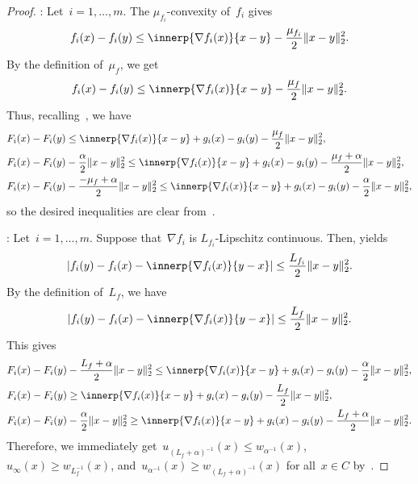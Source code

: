 \documentclass[../main]{subfiles}
\begin{document}
\begin{proof}
    :
Let~$i = 1, \dots, m$.
The $\mu_{f_i}$-convexity of~$f_i$ gives
\begin{equation}
    f_i(x) - f_i(y) \le \innerp{\nabla f_i(x)}{x - y} - \frac{\mu_{f_i}}{2} \norm{x - y}_2^2
.\end{equation}
By the definition of~$\mu_f$, we get
\begin{equation}
    f_i(x) - f_i(y) \le \innerp{\nabla f_i(x)}{x - y} - \frac{\mu_f}{2} \norm{x - y}_2^2
.\end{equation}
Thus, recalling~, we have
\begin{align}
    &F_i(x) - F_i(y) \le \innerp{\nabla f_i(x)}{x - y} + g_i(x) - g_i(y) - \frac{\mu_f}{2} \norm{x - y}_2^2, \\
    &F_i(x) - F_i(y) - \frac{\alpha}{2}\norm{x - y}_2^2 \le \innerp{\nabla f_i(x)}{x - y} + g_i(x) - g_i(y) - \frac{\mu_f + \alpha}{2} \norm{x - y}_2^2, \\
    &F_i(x) - F_i(y) - \frac{- \mu_f + \alpha}{2}\norm{x - y}_2^2 \le \innerp{\nabla f_i(x)}{x - y} + g_i(x) - g_i(y) - \frac{\alpha}{2} \norm{x - y}_2^2
,\end{align}
so the desired inequalities are clear from~.

:
Let~$i = 1, \dots, m$.
Suppose that~$\nabla f_i$ is $L_{f_i}$-Lipschitz continuous.
Then,  yields
\begin{equation}
    \abs*{f_i(y) - f_i(x) - \innerp{\nabla f_i(x)}{y - x}} \le \frac{L_{f_i}}{2}\norm{x - y}_2^2.
\end{equation}
By the definition of~$L_f$, we have
\begin{equation}
    \abs*{f_i(y) - f_i(x) - \innerp{\nabla f_i(x)}{y - x}} \le \frac{L_f}{2}\norm{x - y}_2^2.
\end{equation}
This gives
\begin{align}
    &F_i(x) - F_i(y) - \frac{L_f + \alpha}{2} \norm{x - y}_2^2 \le \innerp{\nabla f_i(x)}{x - y} + g_i(x) - g_i(y) - \frac{\alpha}{2} \norm{x - y}_2^2, \\
    &F_i(x) - F_i(y) \ge \innerp{\nabla f_i(x)}{x - y} + g_i(x) - g_i(y) - \frac{L_f}{2} \norm{x - y}_2^2, \\
    &F_i(x) - F_i(y) - \frac{\alpha}{2} \norm{x - y}_2^2 \ge \innerp{\nabla f_i(x)}{x - y} + g_i(x) - g_i(y) - \frac{L_f + \alpha}{2} \norm{x - y}_2^2
.\end{align}
Therefore, we immediately get~$u_{(L_f + \alpha)^{-1}}(x) \le w_{\alpha^{-1}}(x)$,~$u_\infty(x) \ge w_{L_f^{-1}}(x)$, and~$u_{\alpha^{-1}}(x) \ge w_{(L_f + \alpha)^{-1}}(x)$ for all~$x \in C$ by~.
\end{proof}
\end{document}
